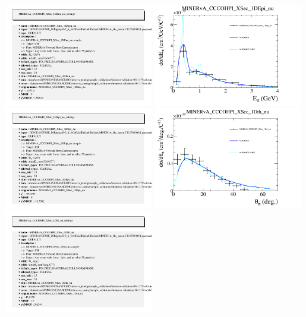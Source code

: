\documentclass{article}
\begin{document}
\includegraphics[width=0.49\textwidth]{figures/nuisance_MINERvA_CCCOHPI_XSec_1DEnu_nu_info.png}
\centering
\includegraphics[width=0.49\textwidth]{figures/nuisance_MINERvA_CCCOHPI_XSec_1DEpi_nu_comp.png}
\includegraphics[width=0.49\textwidth]{figures/nuisance_MINERvA_CCCOHPI_XSec_1DEpi_nu_info.png}
\centering
\includegraphics[width=0.49\textwidth]{figures/nuisance_MINERvA_CCCOHPI_XSec_1Dth_nu_comp.png}
\includegraphics[width=0.49\textwidth]{figures/nuisance_MINERvA_CCCOHPI_XSec_1Dth_nu_info.png}
\end{document}
